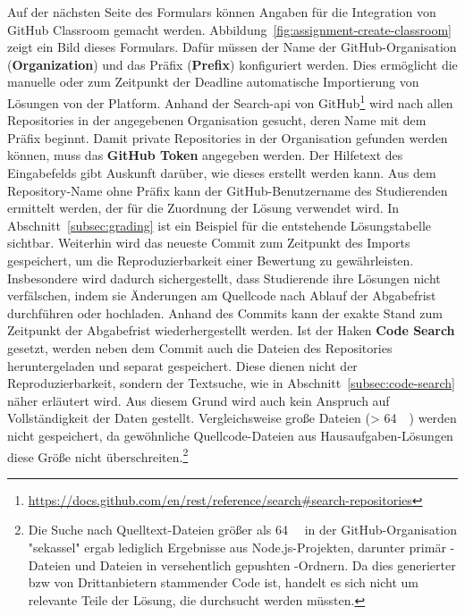 Auf der nächsten Seite des Formulars können Angaben für die Integration von GitHub Classroom gemacht werden.
Abbildung~\ref{fig:assignment-create-classroom} zeigt ein Bild dieses Formulars.
Dafür müssen der Name der GitHub-Organisation (\textbf{Organization}) und das Präfix (\textbf{Prefix}) konfiguriert werden.
Dies ermöglicht die manuelle oder zum Zeitpunkt der Deadline automatische Importierung von Lösungen von der Platform.
Anhand der Search-\ac{api} von GitHub\footnote{
    \url{https://docs.github.com/en/rest/reference/search\#search-repositories}
} wird nach allen Repositories in der angegebenen Organisation gesucht, deren Name mit dem Präfix beginnt.
Damit private Repositories in der Organisation gefunden werden können, muss das \textbf{GitHub Token} angegeben werden.
Der Hilfetext des Eingabefelds gibt Auskunft darüber, wie dieses erstellt werden kann.
Aus dem Repository-Name ohne Präfix kann der GitHub-Benutzername des Studierenden ermittelt werden, der für die Zuordnung der Lösung verwendet wird.
In Abschnitt~\ref{subsec:grading} ist ein Beispiel für die entstehende Lösungstabelle sichtbar.
Weiterhin wird das neueste Commit zum Zeitpunkt des Imports gespeichert, um die Reproduzierbarkeit einer Bewertung zu gewährleisten.
Insbesondere wird dadurch sichergestellt, dass Studierende ihre Lösungen nicht verfälschen, indem sie Änderungen am Quellcode nach Ablauf der Abgabefrist durchführen oder hochladen.
Anhand des Commits kann der exakte Stand zum Zeitpunkt der Abgabefrist wiederhergestellt werden.
Ist der Haken \textbf{Code Search} gesetzt, werden neben dem Commit auch die Dateien des Repositories heruntergeladen und separat gespeichert.
Diese dienen nicht der Reproduzierbarkeit, sondern der Textsuche, wie in Abschnitt~\ref{subsec:code-search} näher erläutert wird.
Aus diesem Grund wird auch kein Anspruch auf Vollständigkeit der Daten gestellt.
Vergleichsweise große Dateien (> \SI{64}{\kibi\byte}) werden nicht gespeichert, da gewöhnliche Quellcode-Dateien aus Hausaufgaben-Lösungen diese Größe nicht überschreiten.\footnote{
    Die Suche nach Quelltext-Dateien größer als \SI{64}{\kibi\byte} in der GitHub-Organisation "sekassel" ergab lediglich Ergebnisse aus Node.js-Projekten, darunter primär -Dateien und Dateien in versehentlich gepushten -Ordnern.
    Da dies generierter \ac{bzw} von Drittanbietern stammender Code ist, handelt es sich nicht um relevante Teile der Lösung, die durchsucht werden müssten.
}

